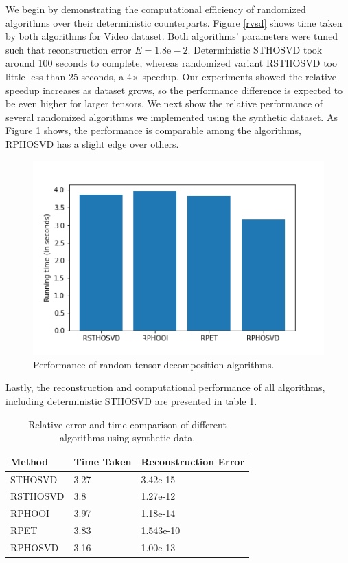 \documentclass[preprint]{elsarticle}
\begin{document}
\noindent We begin by demonstrating the computational efficiency of randomized
algorithms over their deterministic counterparts. Figure \ref{rvsd} shows time
taken by both algorithms for Video dataset. Both algorithms' parameters were tuned
such that reconstruction error $E=1.8\text{e}-2$. Deterministic STHOSVD took around
100 seconds to complete, whereas randomized variant RSTHOSVD too little less than 25 seconds,
a 4$\times$ speedup. Our experiments showed the relative speedup increases as dataset grows,
so the performance difference is expected to be even higher for larger tensors. 
\vskip0.3cm
\noindent We next show the relative performance of several randomized algorithms
we implemented using the synthetic dataset. As Figure \ref{fig:booh} shows, the performance
is comparable among the algorithms, RPHOSVD has a slight edge over others. 

\begin{figure}[H]
    \centering
    \includegraphics[scale=.6]{figs/runtime.png}
    \caption{Performance of random tensor decomposition algorithms.}
    \label{fig:booh}
\end{figure}

\noindent Lastly, the reconstruction and computational performance of all algorithms, including
deterministic STHOSVD are presented in table 1.

\begin{table}[H]
\begin{center}
\begin{tabular}{lll}
\toprule
  Method & Time Taken & Reconstruction Error \\
\midrule
 STHOSVD &       3.27 &             3.42e-15 \\
RSTHOSVD &        3.8 &             1.27e-12 \\
  RPHOOI &       3.97 &             1.18e-14 \\
    RPET &       3.83 &            1.543e-10 \\
 RPHOSVD &       3.16 &             1.00e-13 \\
\bottomrule
\end{tabular}
\caption{Relative error and time comparison of different algorithms using synthetic data.}
\end{center}
\end{table}
\end{document}
